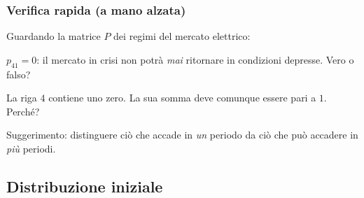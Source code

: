 \begin{frame}%
%

\frametitle{Verifica rapida (a mano alzata)}%
%

%


Guardando la matrice $P$ dei regimi del mercato elettrico:

\bigskip

\begin{stepenumerate}
\item[1.] $p_{41}=0$: il mercato in crisi non potr\`{a} \emph{mai} ritornare
in condizioni depresse. Vero o falso?

\item[2.] La riga $4$ contiene uno zero. La sua somma deve comunque essere
pari a $1$. Perch\'{e}?
\end{stepenumerate}

\bigskip

\begin{center}
{\small Suggerimento: distinguere ci\`{o} che accade in \emph{un} periodo da
ci\`{o} che pu\`{o} accadere in \emph{pi\`{u}} periodi.}
\end{center}

%

\transboxout
\end{frame}%




\subsection{Distribuzione iniziale}%

